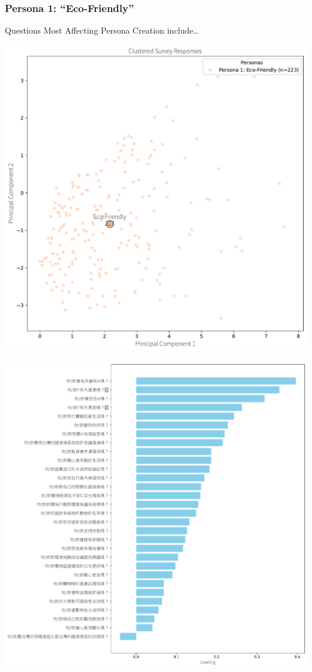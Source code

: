 \documentclass[
  letterpaper,
  DIV=11,
  numbers=noendperiod]{scrartcl}
\begin{document}
\subsubsection{Persona 1:
``Eco-Friendly''}\label{persona-1-eco-friendly}

Questions Most Affecting Persona Creation include\ldots{}

\includegraphics{_thesis_files/figure-pdf/cell-84-output-1.pdf}

\includegraphics{_thesis_files/figure-pdf/cell-84-output-2.pdf}
\end{document}
